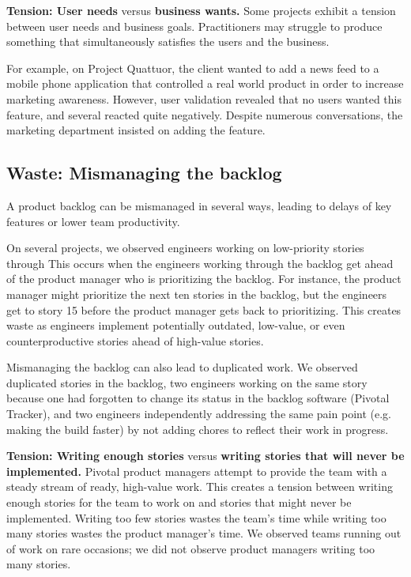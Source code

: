\textbf{Tension: User needs} versus \textbf{business wants.}
Some projects exhibit a tension between user needs and business goals. Practitioners may struggle to produce something that simultaneously satisfies the users and the business.


For example, on Project Quattuor, the client wanted to add a news feed to a mobile phone application that controlled a real world product in order to increase marketing awareness. However, user validation revealed that no users wanted this feature, and several reacted quite negatively. Despite numerous conversations, the marketing department insisted on adding the feature. 
\subsection{Waste: Mismanaging the backlog}
A product backlog can be mismanaged in several ways, leading to delays of key features or lower team productivity. 


On several projects, we observed engineers working on low-priority stories through  This occurs when the engineers working through the backlog get ahead of the product manager who is prioritizing the backlog. For instance, the product manager might prioritize the next ten stories in the backlog, but the engineers get to story 15 before the product manager gets back to prioritizing. This creates waste as engineers implement potentially outdated, low-value, or even counterproductive stories ahead of high-value stories.   


Mismanaging the backlog can also lead to duplicated work. We observed duplicated stories in the backlog, two engineers working on the same story because one had forgotten to change its status in the backlog software (Pivotal Tracker), and two engineers independently addressing the same pain point (e.g. making the build faster) by not adding chores to reflect their work in progress.


\textbf{Tension: Writing enough stories} versus \textbf{writing stories that will never be implemented.}
Pivotal product managers attempt to provide the team with a steady stream of ready, high-value work. This creates a tension between writing enough stories for the team to work on and  stories that might never be implemented. Writing too few stories wastes the team's time while writing too many stories wastes the product manager's time. We observed teams running out of work on rare occasions; we did not observe product managers writing too many stories.  


